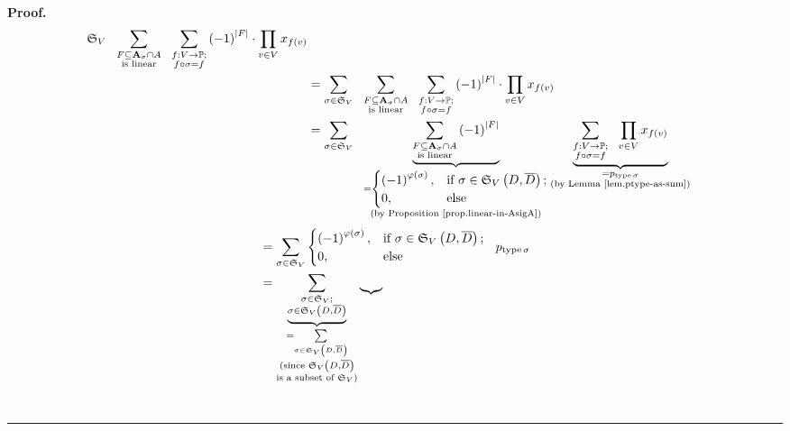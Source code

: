 \documentclass[numbers=enddot,12pt,final,onecolumn,notitlepage]{scrartcl}%
\numberwithin{exer}{section}
\theoremstyle{definition}
\newenvironment{proof}[1][Proof]{\noindent\textbf{#1.} }{\ \rule{0.5em}{0.5em}}
\let\sumnonlimits\sum
\let\prodnonlimits\prod
\renewcommand{\sum}{\sumnonlimits\limits}
\renewcommand{\prod}{\prodnonlimits\limits}
\newenvironment{verlong}{}{}
\begin{document}
\begin{proof}
\begin{verlong}
\begin{align*}
{{\mathfrak{S}_{V}}\ \ \sum_{\substack{F\subseteq\mathbf{A}_{\sigma}\cap
A\\\text{is linear}}}\ \ \sum_{\substack{f:V\rightarrow\mathbb{P}%
\text{;}\\f\circ\sigma=f}}}\left(  -1\right)  ^{\left\vert F\right\vert }%
\cdot\prod_{v\in V}x_{f\left(  v\right)  }\\
&  =\sum_{\sigma\in\mathfrak{S}_{V}}\ \ \sum_{\substack{F\subseteq
\mathbf{A}_{\sigma}\cap A\\\text{is linear}}}\ \ \sum
_{\substack{f:V\rightarrow\mathbb{P}\text{;}\\f\circ\sigma=f}}\left(
-1\right)  ^{\left\vert F\right\vert }\cdot\prod_{v\in V}x_{f\left(  v\right)
}\\
&  =\sum_{\sigma\in\mathfrak{S}_{V}}\ \ \underbrace{\sum_{\substack{F\subseteq
\mathbf{A}_{\sigma}\cap A\\\text{is linear}}}\left(  -1\right)  ^{\left\vert
F\right\vert }}_{\substack{=%
\begin{cases}
\left(  -1\right)  ^{\varphi\left(  \sigma\right)  }, & \text{if }\sigma
\in\mathfrak{S}_{V}\left(  D,\overline{D}\right)  ;\\
0, & \text{else}%
\end{cases}
\\\text{(by Proposition \ref{prop.linear-in-AsigA})}}}\underbrace{\sum
_{\substack{f:V\rightarrow\mathbb{P}\text{;}\\f\circ\sigma=f}}\ \ \prod_{v\in
V}x_{f\left(  v\right)  }}_{\substack{=p_{\operatorname*{type}\sigma
}\\\text{(by Lemma \ref{lem.ptype-as-sum})}}}
\end{align*}%
\begin{align*}
&  =\sum_{\sigma\in\mathfrak{S}_{V}}%
\begin{cases}
\left(  -1\right)  ^{\varphi\left(  \sigma\right)  }, & \text{if }\sigma
\in\mathfrak{S}_{V}\left(  D,\overline{D}\right)  ;\\
0, & \text{else}%
\end{cases}
\ \ p_{\operatorname*{type}\sigma}\\
&  =\underbrace{\sum_{\substack{\sigma\in\mathfrak{S}_{V};\\\sigma
\in\mathfrak{S}_{V}\left(  D,\overline{D}\right)  }}}_{\substack{=\sum
_{\sigma\in\mathfrak{S}_{V}\left(  D,\overline{D}\right)  }\\\text{(since
}\mathfrak{S}_{V}\left(  D,\overline{D}\right)  \\\text{is a subset of
}\mathfrak{S}_{V}\text{)}}}\underbrace{%
}
\end{align*}
\end{verlong}
\end{proof}
\end{document}
